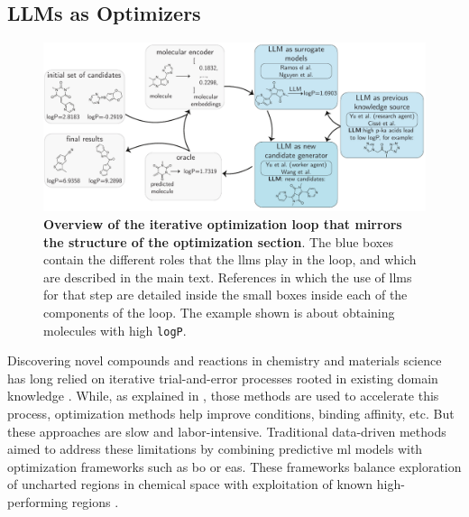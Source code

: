 \subsection{LLMs as Optimizers} \label{sec:llm-optimizers}

\begin{figure}[htb]
    \centering
    \includegraphics[width=1\textwidth]{figures/rescaled_figures/chemrev_figure22.pdf}
    \caption{\textbf{Overview of the iterative optimization loop that mirrors the structure of the optimization section}. The blue boxes contain the different roles that the \glspl{llm} play in the loop, and which are described in the main text. References in which the use of \glspl{llm} for that step are detailed inside the small boxes inside each of the components of the loop. The example shown is about obtaining molecules with high \texttt{logP}.}
    \label{fig:optimization}
\end{figure}

Discovering novel compounds and reactions in chemistry and materials science has long relied on iterative trial-and-error processes rooted in existing domain knowledge \autocite{Taylor2023brief}. While, as explained in , those methods are used to accelerate this process, optimization methods help improve conditions, binding affinity, etc.
But these approaches are slow and labor-intensive. 
Traditional data-driven methods aimed to address these limitations by combining predictive \gls{ml} models with optimization frameworks such as \gls{bo} or \glspl{ea}. 
These frameworks balance exploration of uncharted regions in chemical space with exploitation of known high-performing regions \autocite{Li2024sequential, Hse2021gryffin, Shields2021bayesian, Griffiths2020constrained, RajabiKochi2025adaptive}.


